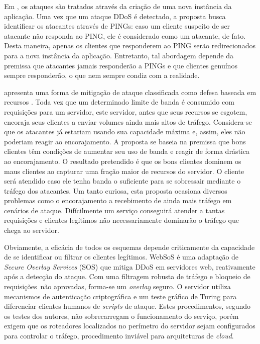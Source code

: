 Em \cite{Bakshi:10}, os ataques são tratados através da criação de uma nova instância da aplicação. Uma vez que um ataque DDoS é detectado, a proposta busca identificar os atacantes através de PINGs: caso um cliente suspeito de ser atacante não responda ao PING, ele é considerado como um atacante, de fato. Desta maneira, apenas os clientes que responderem ao PING serão 
redirecionados para a nova instância da aplicação. Entretanto, tal abordagem depende da premissa que atacantes jamais responderão a PINGs e que clientes genuínos sempre responderão, o que nem sempre condiz com a realidade.




\cite{Walfish:2010:DDO:1731060.1731063} apresenta uma forma de mitigação de ataque classificada como defesa baseada em recursos \cite{Dwork:1992:PVP:646757.705669}. %
Toda vez que um determinado limite de banda é consumido com requisições para um servidor, este servidor, antes que seus recursos se esgotem, encoraja seus clientes a enviar volumes ainda mais altos de tráfego. Considera-se que os atacantes já estariam usando sua capacidade máxima e, assim, eles não poderiam reagir ao encorajamento. A proposta se baseia na premissa que bons clientes têm condições de aumentar seu uso de banda e reagir de forma drástica ao encorajamento. O resultado pretendido é que os bons clientes dominem os maus clientes ao capturar uma fração maior de recursos do servidor. O cliente será atendido caso ele tenha banda o suficiente para se sobressair mediante o tráfego dos atacantes. Um tanto curiosa, esta proposta ocasiona diversos problemas como %
o encorajamento a recebimento de ainda mais tráfego em cenários de ataque. 
Difícilmente um serviço conseguirá atender a tantas requisições e clientes legítimos não necessariamente dominarão o tráfego que chega ao servidor.


Obviamente, a eficácia de todos os esquemas depende criticamente da capacidade de se identificar ou filtrar os clientes legítimos. 
%
WebSoS \cite{Stavrou:2005:WOS:1090583.1648614} é uma adaptação de \emph{Secure Overlay Services} (SOS) \cite{Keromytis:2002:SSO:964725.633032} que mitiga DDoS em servidores web, reativamente após a detecção do ataque. Com uma filtragem robusta de tráfego e bloqueio de requisições~não aprovadas, forma-se um \emph{overlay} seguro. O servidor utiliza mecanismos de autenticação criptográfica e um teste gráfico de Turing \cite{Dietrich00analyzingdistributed} para diferenciar clientes humanos de \emph{scripts} de ataque. Estes procedimentos, segundo os testes dos autores, não sobrecarregam o funcionamento do serviço, porém exigem que os roteadores localizados no perímetro do servidor sejam configurados para controlar o tráfego, procedimento inviável para arquiteturas de \emph{cloud}.
